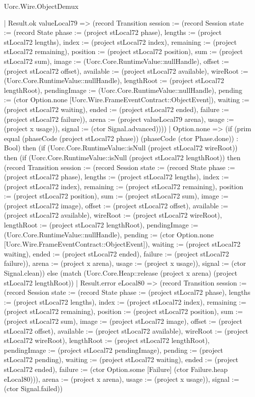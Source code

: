 \begin{lexlean}{Uorc.Wire.ObjectDemux}
\begin{semanticmodule}
{      | Result.ok valueLocal79 => (record Transition {session := (record Session {state := (record State {phase := (project stLocal72 phase), lengths := (project stLocal72 lengths), index := (project stLocal72 index), remaining := (project stLocal72 remaining), position := (project stLocal72 position), sum := (project stLocal72 sum), image := (Uorc.Core.RuntimeValue::nullHandle), offset := (project stLocal72 offset), available := (project stLocal72 available), wireRoot := (Uorc.Core.RuntimeValue::nullHandle), lengthRoot := (project stLocal72 lengthRoot), pendingImage := (Uorc.Core.RuntimeValue::nullHandle), pending := (ctor Option.none [Uorc.Wire.FrameEventContract::ObjectEvent]), waiting := (project stLocal72 waiting), ended := (project stLocal72 ended), failure := (project stLocal72 failure)}), arena := (project valueLocal79 arena), usage := (project x usage)}), signal := (ctor Signal.advanced)})))
    | Option.none => (if (prim equal (phaseCode (project stLocal72 phase)) (phaseCode (ctor Phase.done)) : Bool) then (if (Uorc.Core.RuntimeValue::isNull (project stLocal72 wireRoot)) then (if (Uorc.Core.RuntimeValue::isNull (project stLocal72 lengthRoot)) then (record Transition {session := (record Session {state := (record State {phase := (project stLocal72 phase), lengths := (project stLocal72 lengths), index := (project stLocal72 index), remaining := (project stLocal72 remaining), position := (project stLocal72 position), sum := (project stLocal72 sum), image := (project stLocal72 image), offset := (project stLocal72 offset), available := (project stLocal72 available), wireRoot := (project stLocal72 wireRoot), lengthRoot := (project stLocal72 lengthRoot), pendingImage := (Uorc.Core.RuntimeValue::nullHandle), pending := (ctor Option.none [Uorc.Wire.FrameEventContract::ObjectEvent]), waiting := (project stLocal72 waiting), ended := (project stLocal72 ended), failure := (project stLocal72 failure)}), arena := (project x arena), usage := (project x usage)}), signal := (ctor Signal.clean)}) else (match (Uorc.Core.Heap::release (project x arena) (project stLocal72 lengthRoot))
      | Result.error eLocal80 => (record Transition {session := (record Session {state := (record State {phase := (project stLocal72 phase), lengths := (project stLocal72 lengths), index := (project stLocal72 index), remaining := (project stLocal72 remaining), position := (project stLocal72 position), sum := (project stLocal72 sum), image := (project stLocal72 image), offset := (project stLocal72 offset), available := (project stLocal72 available), wireRoot := (project stLocal72 wireRoot), lengthRoot := (project stLocal72 lengthRoot), pendingImage := (project stLocal72 pendingImage), pending := (project stLocal72 pending), waiting := (project stLocal72 waiting), ended := (project stLocal72 ended), failure := (ctor Option.some [Failure] (ctor Failure.heap eLocal80))}), arena := (project x arena), usage := (project x usage)}), signal := (ctor Signal.failed)})
}
\end{semanticmodule}
\end{lexlean}
